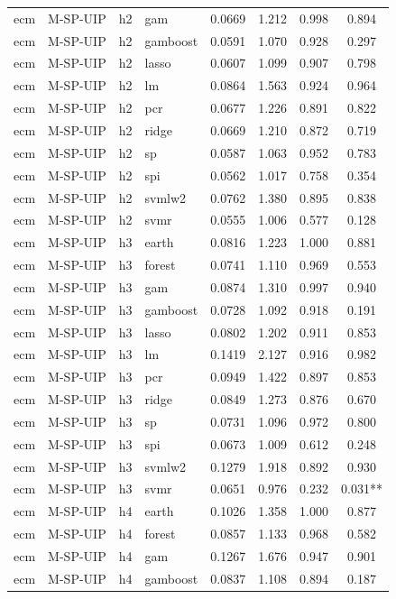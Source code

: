 \begin{ThreePartTable}
\begin{longtable}[t]{llclcccc}
ecm & M-SP-UIP & h2 & gam & 0.0669 & 1.212 & 0.998 & 0.894\\
ecm & M-SP-UIP & h2 & gamboost & 0.0591 & 1.070 & 0.928 & 0.297\\
ecm & M-SP-UIP & h2 & lasso & 0.0607 & 1.099 & 0.907 & 0.798\\
ecm & M-SP-UIP & h2 & lm & 0.0864 & 1.563 & 0.924 & 0.964\\
ecm & M-SP-UIP & h2 & pcr & 0.0677 & 1.226 & 0.891 & 0.822\\
ecm & M-SP-UIP & h2 & ridge & 0.0669 & 1.210 & 0.872 & 0.719\\
ecm & M-SP-UIP & h2 & sp & 0.0587 & 1.063 & 0.952 & 0.783\\
ecm & M-SP-UIP & h2 & spi & 0.0562 & 1.017 & 0.758 & 0.354\\
ecm & M-SP-UIP & h2 & svmlw2 & 0.0762 & 1.380 & 0.895 & 0.838\\
ecm & M-SP-UIP & h2 & svmr & 0.0555 & 1.006 & 0.577 & 0.128\\
\addlinespace
ecm & M-SP-UIP & h3 & earth & 0.0816 & 1.223 & 1.000 & 0.881\\
ecm & M-SP-UIP & h3 & forest & 0.0741 & 1.110 & 0.969 & 0.553\\
ecm & M-SP-UIP & h3 & gam & 0.0874 & 1.310 & 0.997 & 0.940\\
ecm & M-SP-UIP & h3 & gamboost & 0.0728 & 1.092 & 0.918 & 0.191\\
ecm & M-SP-UIP & h3 & lasso & 0.0802 & 1.202 & 0.911 & 0.853\\
ecm & M-SP-UIP & h3 & lm & 0.1419 & 2.127 & 0.916 & 0.982\\
ecm & M-SP-UIP & h3 & pcr & 0.0949 & 1.422 & 0.897 & 0.853\\
ecm & M-SP-UIP & h3 & ridge & 0.0849 & 1.273 & 0.876 & 0.670\\
ecm & M-SP-UIP & h3 & sp & 0.0731 & 1.096 & 0.972 & 0.800\\
ecm & M-SP-UIP & h3 & spi & 0.0673 & 1.009 & 0.612 & 0.248\\
ecm & M-SP-UIP & h3 & svmlw2 & 0.1279 & 1.918 & 0.892 & 0.930\\
ecm & M-SP-UIP & h3 & svmr & 0.0651 & 0.976 & 0.232 & 0.031**\\
\addlinespace
ecm & M-SP-UIP & h4 & earth & 0.1026 & 1.358 & 1.000 & 0.877\\
ecm & M-SP-UIP & h4 & forest & 0.0857 & 1.133 & 0.968 & 0.582\\
ecm & M-SP-UIP & h4 & gam & 0.1267 & 1.676 & 0.947 & 0.901\\
ecm & M-SP-UIP & h4 & gamboost & 0.0837 & 1.108 & 0.894 & 0.187\\

\end{longtable}
\end{ThreePartTable}
